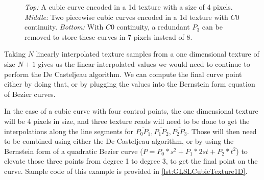 \documentclass{jcgt}
\begin{document}
  \begin{figure}

    \vspace{5mm}


    \vspace{5mm}

    \caption{\textit{Top:} A cubic curve encoded in a 1d texture with a size of 4 pixels.  \textit{Middle:} Two piecewise cubic curves encoded in a 1d texture with $C0$ continuity.  \textit{Bottom:} With $C0$ continuity, a redundant $P_3$ can be removed to store these curves in 7 pixels instead of 8. }    
    \label{fig:texlayeout1d}
  \end{figure}

Taking $N$ linearly interpolated texture samples from a one dimensional texture of size $N+1$ gives us the linear interpolated values we would need to continue to perform the De Casteljeau algorithm.  We can compute the final curve point either by doing that, or by plugging the values into the Bernstein form equation of Bezier curves.

In the case of a cubic curve with four control points, the one dimensional texture will be 4 pixels in size, and three texture reads will need to be done to get the interpolations along the line segments for $\overline{P_0P_1},\overline{P_1P_2},\overline{P_2P_3}$.  Those will then need to be combined using either the De Casteljeau algorithm, or by using the Bernstein form of a quadratic Bezier curve ($P = P_0*s^2 + P_1*2st + P_2*t^2$) to elevate those three points from degree 1 to degree 3, to get the final point on the curve.  Sample code of this example is provided in \autoref{lst:GLSLCubicTexture1D}.
\end{document}
